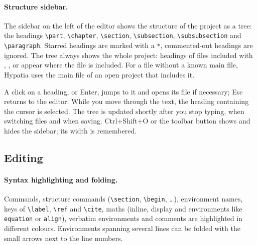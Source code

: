 \documentclass[11pt]{article}
\newcommand{\key}[1]{\textsf{#1}}
\begin{document}
    \paragraph{Structure sidebar.} The sidebar on the left of the editor shows the structure of the project as a tree: the headings \verb+\part+, \verb+\chapter+, \verb+\section+, \verb+\subsection+, \verb+\subsubsection+ and \verb+\paragraph+. Starred headings are marked with a \verb+*+, commented-out headings are ignored. The tree always shows the whole project: headings of files included with \verb++, \verb++, \verb++ or \verb++ appear where the file is included. For a file without a known main file, Hypatia uses the main file of an open project that includes it.

    A click on a heading, or \key{Enter}, jumps to it and opens its file if necessary; \key{Esc} returns to the editor. While you move through the text, the heading containing the cursor is selected. The tree is updated shortly after you stop typing, when switching files and when saving. \key{Ctrl+Shift+O} or the toolbar button shows and hides the sidebar; its width is remembered.
    
    \subsection{Editing}

    \paragraph{Syntax highlighting and folding.} Commands, structure commands (\verb+\section+, \verb+\begin+, \ldots), environment names, keys of \verb+\label+, \verb+\ref+ and \verb+\cite+, maths (inline, display and environments like \verb+equation+ or \verb+align+), verbatim environments and comments are highlighted in different colours. Environments spanning several lines can be folded with the small arrows next to the line numbers.
\end{document}
